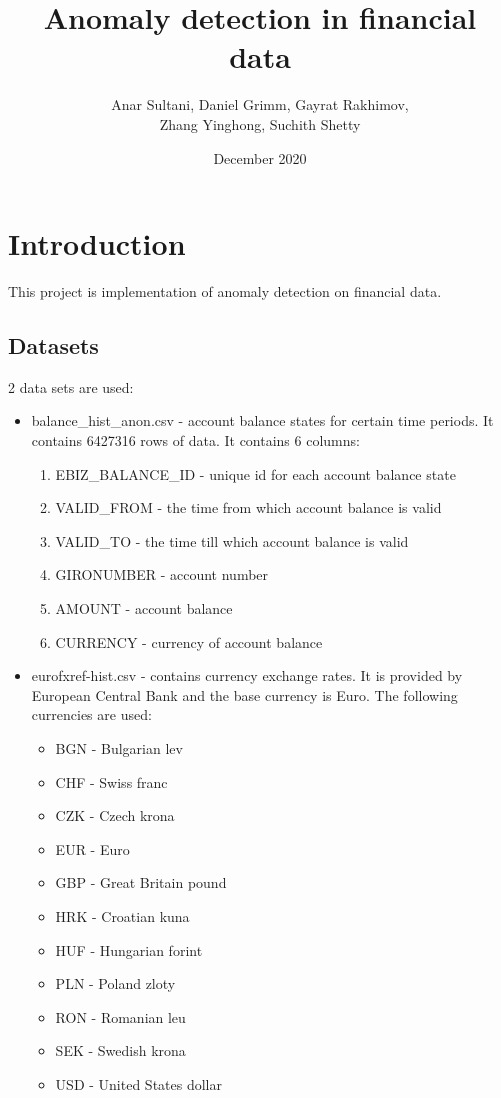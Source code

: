 \documentclass{article}
\title{Anomaly detection in financial data}
\author{Anar Sultani, Daniel Grimm, Gayrat Rakhimov,\\ Zhang Yinghong, Suchith Shetty}
\date{December 2020}
\begin{document}
\maketitle

\section{Introduction}

This project is implementation of anomaly detection on financial data.

\subsection{Datasets}

2 data sets are used:
\begin{itemize}
    \item balance\_hist\_anon.csv - account balance states for certain time periods. It contains 6427316 rows of data.
    It contains 6 columns:
    \begin{enumerate}
    \item EBIZ\_BALANCE\_ID - unique id for each account balance state
    \item VALID\_FROM - the time from which account balance is valid
    \item VALID\_TO - the time till which account balance is valid
    \item GIRONUMBER - account number
    \item AMOUNT - account balance
    \item CURRENCY - currency of account balance
    \end{enumerate}
    \item eurofxref-hist.csv - contains currency exchange rates. It is provided by European Central Bank\cite{ecb} and the base currency is Euro. The following currencies are used:
\begin{itemize}
    \item BGN - Bulgarian lev
    \item CHF - Swiss franc
    \item CZK - Czech krona
    \item EUR - Euro
    \item GBP - Great Britain pound
    \item HRK - Croatian kuna
    \item HUF - Hungarian forint
    \item PLN - Poland zloty
    \item RON - Romanian leu
    \item SEK - Swedish krona
    \item USD - United States dollar
\end{itemize}
\end{itemize}
\end{document}
